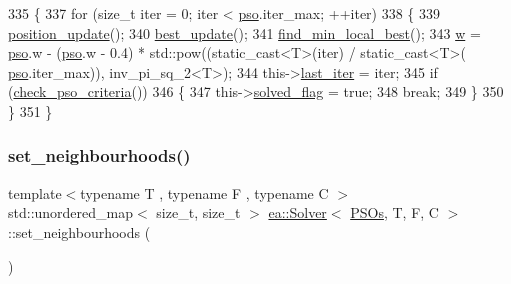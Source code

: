 \begin{DoxyCode}
335     \{
337         \textcolor{keywordflow}{for} (\textcolor{keywordtype}{size\_t} iter = 0; iter < \hyperlink{classea_1_1_solver_3_01_p_s_os_00_01_t_00_01_f_00_01_c_01_4_a1f1aa62756a73565ebe0ca1fbc084ea5}{pso}.iter\_max; ++iter)
338         \{
339             \hyperlink{classea_1_1_solver_3_01_p_s_os_00_01_t_00_01_f_00_01_c_01_4_a91feb28b5a3b292da8eedb1f782d53c0}{position\_update}();
340             \hyperlink{classea_1_1_solver_3_01_p_s_os_00_01_t_00_01_f_00_01_c_01_4_ab52c41eb3bea4aa9465ff254bee82990}{best\_update}();
341             \hyperlink{classea_1_1_solver_3_01_p_s_os_00_01_t_00_01_f_00_01_c_01_4_a012b67607139916c790167fefc1f38e7}{find\_min\_local\_best}();
343             \hyperlink{classea_1_1_solver_3_01_p_s_os_00_01_t_00_01_f_00_01_c_01_4_a4f690e68bf36069ba446ef96b03da6f6}{w} = \hyperlink{classea_1_1_solver_3_01_p_s_os_00_01_t_00_01_f_00_01_c_01_4_a1f1aa62756a73565ebe0ca1fbc084ea5}{pso}.w - (\hyperlink{classea_1_1_solver_3_01_p_s_os_00_01_t_00_01_f_00_01_c_01_4_a1f1aa62756a73565ebe0ca1fbc084ea5}{pso}.w - 0.4) * std::pow((static\_cast<T>(iter) / static\_cast<T>(
      \hyperlink{classea_1_1_solver_3_01_p_s_os_00_01_t_00_01_f_00_01_c_01_4_a1f1aa62756a73565ebe0ca1fbc084ea5}{pso}.iter\_max)), inv\_pi\_sq\_2<T>);
344             this->\hyperlink{classea_1_1_solver__base_a8f9a321eb87e57636cf0b0f3a57b6fc2}{last\_iter} = iter;
345             \textcolor{keywordflow}{if} (\hyperlink{classea_1_1_solver_3_01_p_s_os_00_01_t_00_01_f_00_01_c_01_4_afd7a166bcdc0730431ca9406f0d0e030}{check\_pso\_criteria}())
346             \{
347                 this->\hyperlink{classea_1_1_solver__base_a1cdb824e8df6d4a8f228820ea85c9b05}{solved\_flag} = \textcolor{keyword}{true};
348                 \textcolor{keywordflow}{break};
349             \}
350         \}
351     \}
\end{DoxyCode}
\mbox{\label{classea_1_1_solver_3_01_p_s_os_00_01_t_00_01_f_00_01_c_01_4_acf9a10b2f3e095c365fa787c06709a3d}} 
\subsubsection{\texorpdfstring{set\+\_\+neighbourhoods()}{set\_neighbourhoods()}}
{\footnotesize\ttfamily template$<$typename T , typename F , typename C $>$ \\
std\+::unordered\+\_\+map$<$ size\+\_\+t, size\+\_\+t $>$ \hyperlink{classea_1_1_solver}{ea\+::\+Solver}$<$ \hyperlink{structea_1_1_p_s_os}{P\+S\+Os}, T, F, C $>$\+::set\+\_\+neighbourhoods (\begin{DoxyParamCaption}{ }\end{DoxyParamCaption})\hspace{0.3cm}{\ttfamily [private]}}




